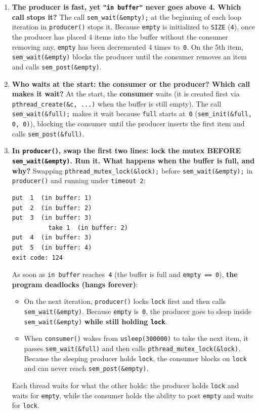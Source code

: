 \documentclass{../latex/utmreport}
\providecommand{\tightlist}{\setlength{\itemsep}{0pt}\setlength{\parskip}{0pt}}
\begin{document}
\begin{enumerate}
\tightlist
\item \textbf{The producer is fast, yet \texttt{"in buffer"} never goes above 4. Which call stops it?}
The call \texttt{sem\_wait(\&empty);} at the beginning of each loop iteration in \texttt{producer()} stops it. Because \texttt{empty} is initialized to \texttt{SIZE} (\texttt{4}), once the producer has placed 4 items into the buffer without the consumer removing any, \texttt{empty} has been decremented 4 times to~\texttt{0}. On the 5th item, \texttt{sem\_wait(\&empty)} blocks the producer until the consumer removes an item and calls \texttt{sem\_post(\&empty)}.

\item \textbf{Who waits at the start: the consumer or the producer? Which call makes it wait?}
At the start, the \textbf{consumer} waits (it is created first via \texttt{pthread\_create(\&c, ...)} when the buffer is still empty). The call \texttt{sem\_wait(\&full);} makes it wait because \texttt{full} starts at~\texttt{0} (\texttt{sem\_init(\&full, 0, 0)}), blocking the consumer until the producer inserts the first item and calls \texttt{sem\_post(\&full)}.

\item \textbf{In \texttt{producer()}, swap the first two lines: lock the mutex BEFORE \texttt{sem\_wait(\&empty)}. Run it. What happens when the buffer is full, and why?}
Swapping \texttt{pthread\_mutex\_lock(\&lock);} before \texttt{sem\_wait(\&empty);} in \texttt{producer()} and running under \texttt{timeout 2}:
\begin{lstlisting}
put  1  (in buffer: 1)
put  2  (in buffer: 2)
put  3  (in buffer: 3)
          take 1  (in buffer: 2)
put  4  (in buffer: 3)
put  5  (in buffer: 4)
exit code: 124
\end{lstlisting}
As soon as \texttt{in buffer} reaches~\texttt{4} (the buffer is full and \texttt{empty == 0}), \textbf{the program deadlocks (hangs forever)}:
\begin{itemize}
\tightlist
\item On the next iteration, \texttt{producer()} locks \texttt{lock} first and then calls \texttt{sem\_wait(\&empty)}. Because \texttt{empty} is~\texttt{0}, the producer goes to sleep inside \texttt{sem\_wait(\&empty)} \textbf{while still holding \texttt{lock}}.
\item When \texttt{consumer()} wakes from \texttt{usleep(300000)} to take the next item, it passes \texttt{sem\_wait(\&full)} and then calls \texttt{pthread\_mutex\_lock(\&lock)}. Because the sleeping producer holds \texttt{lock}, the consumer blocks on \texttt{lock} and can never reach \texttt{sem\_post(\&empty)}.
\end{itemize}
Each thread waits for what the other holds: the producer holds \texttt{lock} and waits for \texttt{empty}, while the consumer holds the ability to post \texttt{empty} and waits for \texttt{lock}.
\end{enumerate}
\end{document}
